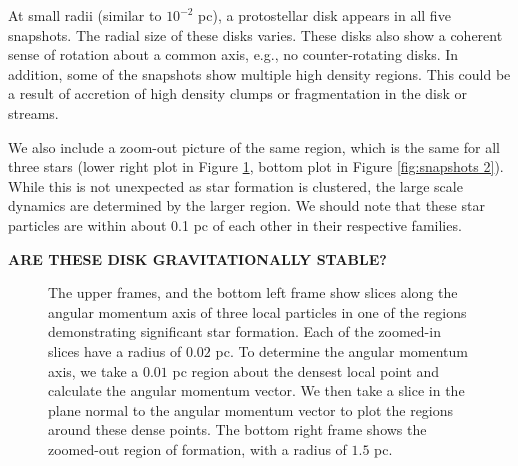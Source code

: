 \documentclass{emulateapj}
\begin{document}
At small radii (similar to $10^{-2}$ pc), a protostellar disk appears in all five snapshots. The radial size of these disks varies. These disks also show a coherent sense of rotation about a common axis, e.g., no counter-rotating disks. In addition, some of the snapshots show multiple high density regions.  This could be a result of accretion of high density clumps or fragmentation in the disk or streams.  

We also include a zoom-out picture of the same region, which is the same for all three stars (lower right plot in Figure \ref{fig:snapshots}, bottom plot in Figure \ref{fig:snapshots 2}).  While this is not unexpected as star formation is clustered, the large scale dynamics are determined by the larger region.  We should note that these star particles are within about 0.1 pc of each other in their respective families.  

{\bf ARE THESE DISK GRAVITATIONALLY STABLE?}

\begin{figure}
\caption{The upper frames, and the bottom left frame show slices along the angular momentum axis of three local particles in one of the regions demonstrating significant star formation.  Each of the zoomed-in slices have a radius of $0.02$ pc.  To determine the angular momentum axis, we take a $0.01$ pc region about the densest local point and calculate the angular momentum vector.  We then take a slice in the plane normal to the angular momentum vector to plot the regions around these dense points.  The bottom right frame shows the zoomed-out region of formation, with a radius of $1.5$ pc.    \label{fig:snapshots}}
\end{figure}
\end{document}
